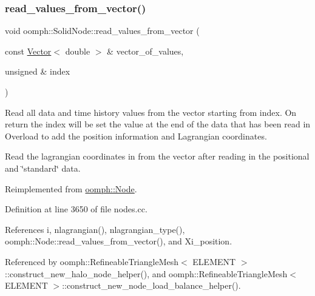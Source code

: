 \subsubsection{\texorpdfstring{read\+\_\+values\+\_\+from\+\_\+vector()}{read\_values\_from\_vector()}}
{\footnotesize\ttfamily void oomph\+::\+Solid\+Node\+::read\+\_\+values\+\_\+from\+\_\+vector (\begin{DoxyParamCaption}\item[{const \hyperlink{classoomph_1_1Vector}{Vector}$<$ double $>$ \&}]{vector\+\_\+of\+\_\+values,  }\item[{unsigned \&}]{index }\end{DoxyParamCaption})\hspace{0.3cm}{\ttfamily [virtual]}}



Read all data and time history values from the vector starting from index. On return the index will be set the value at the end of the data that has been read in Overload to add the position information and Lagrangian coordinates. 

Read the lagrangian coordinates in from the vector after reading in the positional and \char`\"{}standard\char`\"{} data. 

Reimplemented from \hyperlink{classoomph_1_1Node_accb033ab8ed4f96331014f7c4cd131f9}{oomph\+::\+Node}.



Definition at line 3650 of file nodes.\+cc.



References i, nlagrangian(), nlagrangian\+\_\+type(), oomph\+::\+Node\+::read\+\_\+values\+\_\+from\+\_\+vector(), and Xi\+\_\+position.



Referenced by oomph\+::\+Refineable\+Triangle\+Mesh$<$ E\+L\+E\+M\+E\+N\+T $>$\+::construct\+\_\+new\+\_\+halo\+\_\+node\+\_\+helper(), and oomph\+::\+Refineable\+Triangle\+Mesh$<$ E\+L\+E\+M\+E\+N\+T $>$\+::construct\+\_\+new\+\_\+node\+\_\+load\+\_\+balance\+\_\+helper().

\mbox{\label{classoomph_1_1SolidNode_abd91751e0695df391ecd0e8a9249eb4f}} 
